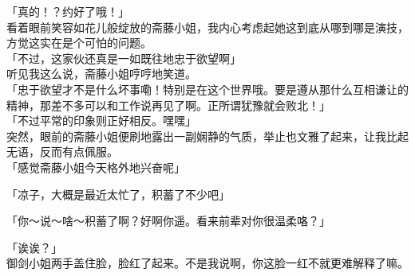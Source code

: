 「真的！？约好了哦！」\\

看着眼前笑容如花儿般绽放的斋藤小姐，我内心考虑起她这到底从哪到哪是演技，方觉这实在是个可怕的问题。\\

「不过，这家伙还真是一如既往地忠于欲望啊」\\

听见我这么说，斋藤小姐哼哼地笑道。\\

「忠于欲望才不是什么坏事嘞！特别是在这个世界哦。要是遵从那什么互相谦让的精神，那差不多可以和工作说再见了啊。正所谓犹豫就会败北！」\\

「不过平常的印象则正好相反。嘿嘿」\\

突然，眼前的斋藤小姐便刷地露出一副娴静的气质，举止也文雅了起来，让我比起无语，反而有点佩服。\\

「感觉斋藤小姐今天格外地兴奋呢」

「凉子，大概是最近太忙了，积蓄了不少吧」

「你～说～啥～积蓄了啊？好啊你遥。看来前辈对你很温柔咯？」

「诶诶？」\\

御剑小姐两手盖住脸，脸红了起来。不是我说啊，你这脸一红不就更难解释了嘛。\\

